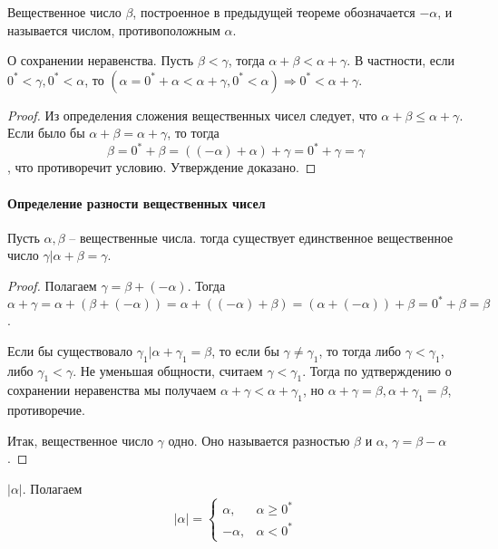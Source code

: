 \documentclass[main]{subfiles}
\begin{document}
\begin{definition}
    Вещественное число $\beta$, построенное в предыдущей теореме обозначается
    $-\alpha$, и называется числом, противоположным $\alpha$. 
\end{definition}

\begin{assertion}
    О сохранении неравенства. Пусть $\beta < \gamma$, тогда $\alpha + \beta <
    \alpha + \gamma$. В частности, если $0^* < \gamma, 0^* < \alpha$, то 
    $(\alpha = 0^* + \alpha < \alpha + \gamma, 0^* < \alpha) \Rightarrow 
    0^* < \alpha + \gamma$.
\end{assertion}
\begin{proof}
    Из определения сложения вещественных чисел следует, что $\alpha + \beta \leq 
    \alpha + \gamma$. Если было бы $\alpha + \beta = \alpha + \gamma$, то тогда
    \[\beta = 0^* + \beta = ((-\alpha) + \alpha) + \gamma = 0^* + \gamma = \gamma\],
    что противоречит условию. Утверждение доказано.
\end{proof}

\paragraph{Определение разности вещественных чисел}
\begin{theorem}
    Пусть $\alpha, \beta$ -- вещественные числа. тогда существует единственное
    вещественное число $\gamma | \alpha + \beta = \gamma$.
\end{theorem}
\begin{proof}
    Полагаем $\gamma = \beta + (-\alpha)$. Тогда $\alpha + \gamma = \alpha +
    (\beta + (-\alpha)) = \alpha + ((-\alpha) + \beta) = (\alpha + (-\alpha)) +
    \beta = 0^* + \beta = \beta$.

    Если бы существовало $\gamma_1 | \alpha + \gamma_1 = \beta$, то если бы
    $\gamma \neq \gamma_1$, то тогда либо $\gamma < \gamma_1$, либо $\gamma_1 <
    \gamma$. Не уменьшая общности, считаем $\gamma < \gamma_1$. Тогда по удтверждению
    о сохранении неравенства мы получаем $\alpha + \gamma < \alpha + \gamma_1$,
    но $\alpha + \gamma = \beta, \alpha + \gamma_1 = \beta$, противоречие.

    Итак, вещественное число $\gamma$ одно. Оно называется разностью $\beta$ и 
    $\alpha$, $\gamma = \beta - \alpha$.
\end{proof}

\begin{definition}
    $|\alpha|$. Полагаем
    \begin{equation*}
        |\alpha| =
        \begin{cases}
            \alpha, & \alpha \geq 0^* \\
            -\alpha, & \alpha < 0^*
        \end{cases}
    \end{equation*} 
\end{definition}
\end{document}
